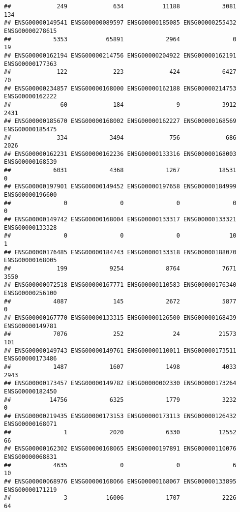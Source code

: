 \documentclass[
]{article}
\begin{document}
\begin{verbatim}
##             249             634           11188            3081             134 
## ENSG00000149541 ENSG00000089597 ENSG00000185085 ENSG00000255432 ENSG00000278615 
##            5353           65891            2964               0              19 
## ENSG00000162194 ENSG00000214756 ENSG00000204922 ENSG00000162191 ENSG00000177363 
##             122             223             424            6427              70 
## ENSG00000234857 ENSG00000168000 ENSG00000162188 ENSG00000214753 ENSG00000162222 
##              60             184               9            3912            2431 
## ENSG00000185670 ENSG00000168002 ENSG00000162227 ENSG00000168569 ENSG00000185475 
##             334            3494             756             686            2026 
## ENSG00000162231 ENSG00000162236 ENSG00000133316 ENSG00000168003 ENSG00000168539 
##            6031            4368            1267           18531               0 
## ENSG00000197901 ENSG00000149452 ENSG00000197658 ENSG00000184999 ENSG00000196600 
##               0               0               0               0               0 
## ENSG00000149742 ENSG00000168004 ENSG00000133317 ENSG00000133321 ENSG00000133328 
##               0               0               0              10               1 
## ENSG00000176485 ENSG00000184743 ENSG00000133318 ENSG00000188070 ENSG00000168005 
##             199            9254            8764            7671            3550 
## ENSG00000072518 ENSG00000167771 ENSG00000110583 ENSG00000176340 ENSG00000256100 
##            4087             145            2672            5877               0 
## ENSG00000167770 ENSG00000133315 ENSG00000126500 ENSG00000168439 ENSG00000149781 
##            7076             252              24           21573             101 
## ENSG00000149743 ENSG00000149761 ENSG00000110011 ENSG00000173511 ENSG00000173486 
##            1487            1607            1498            4033            2943 
## ENSG00000173457 ENSG00000149782 ENSG00000002330 ENSG00000173264 ENSG00000182450 
##           14756            6325            1779            3232               0 
## ENSG00000219435 ENSG00000173153 ENSG00000173113 ENSG00000126432 ENSG00000168071 
##               1            2020            6330           12552              66 
## ENSG00000162302 ENSG00000168065 ENSG00000197891 ENSG00000110076 ENSG00000068831 
##            4635               0               0               6              10 
## ENSG00000068976 ENSG00000168066 ENSG00000168067 ENSG00000133895 ENSG00000171219 
##               3           16006            1707            2226              64 

\end{verbatim}
\end{document}
